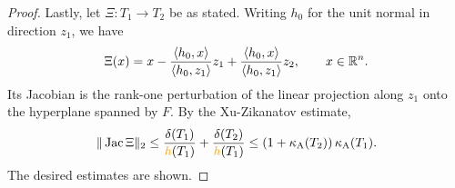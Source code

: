 \documentclass[10pt,letterpaper]{article}
\newcommand{\mwl}[1]{{\color{red}#1}}
\begin{document}
\begin{proof}

    Lastly, let $\Xi : T_1 \rightarrow T_2$ be as stated. 
    Writing $h_0$ for the unit normal in direction $z_1$, we have 
    \begin{align*}
        \Xi(x) 
        = 
        x 
        - \frac{ \langle h_0, x \rangle }{ \langle h_0, z_1 \rangle } z_1
        + \frac{ \langle h_0, x \rangle }{ \langle h_0, z_1 \rangle } z_2
        ,
        \qquad 
        x \in {\mathbb R}^{n}
        .
    \end{align*}
    Its Jacobian is the rank-one perturbation of the linear projection along $z_1$ onto the hyperplane spanned by $F$. 
    By the Xu-Zikanatov estimate,
    \begin{align*}
        \matnorm{ \Jacobian \Xi }
        \leq 
        \frac{ \diam(T_1) }{ \height(T_1) }
        +
        \frac{ \diam(T_2) }{ \height(T_1) }
        \leq 
        \left( 1 + \aspectratio(T_2) \right)
        \aspectratio(T_1)
        .
    \end{align*}
    The desired estimates are shown.

\end{proof}
\end{document}
